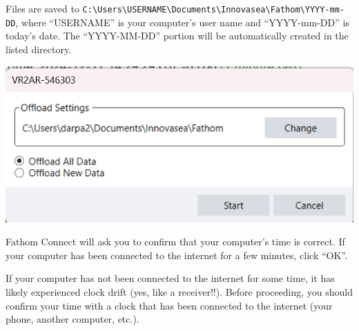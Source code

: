 \documentclass[
  letterpaper,
  DIV=11,
  numbers=noendperiod]{scrreprt}
\begin{document}
\begin{tcolorbox}[enhanced jigsaw, title=\textcolor{quarto-callout-note-color}{\faInfo}\hspace{0.5em}{Note}, leftrule=.75mm, colback=white, colframe=quarto-callout-note-color-frame, opacityback=0, toptitle=1mm, titlerule=0mm, colbacktitle=quarto-callout-note-color!10!white, toprule=.15mm, left=2mm, bottomtitle=1mm, arc=.35mm, breakable, coltitle=black, rightrule=.15mm, bottomrule=.15mm, opacitybacktitle=0.6]

Files are saved to
\texttt{C:\textbackslash{}Users\textbackslash{}USERNAME\textbackslash{}Documents\textbackslash{}Innovasea\textbackslash{}Fathom\textbackslash{}YYYY-mm-DD},
where ``USERNAME'' is your computer's user name and ``YYYY-mm-DD'' is
today's date. The ``YYYY-MM-DD'' portion will be automatically created
in the listed directory.

\end{tcolorbox}

\includegraphics{images/fathom/offload_info.png}

Fathom Connect will ask you to confirm that your computer's time is
correct. If your computer has been connected to the internet for a few
minutes, click ``OK''.

\begin{tcolorbox}[enhanced jigsaw, title=\textcolor{quarto-callout-warning-color}{\faExclamationTriangle}\hspace{0.5em}{Warning}, leftrule=.75mm, colback=white, colframe=quarto-callout-warning-color-frame, opacityback=0, toptitle=1mm, titlerule=0mm, colbacktitle=quarto-callout-warning-color!10!white, toprule=.15mm, left=2mm, bottomtitle=1mm, arc=.35mm, breakable, coltitle=black, rightrule=.15mm, bottomrule=.15mm, opacitybacktitle=0.6]

If your computer has not been connected to the internet for some time,
it has likely experienced clock drift (yes, like a receiver!!). Before
proceeding, you should confirm your time with a clock that has been
connected to the internet (your phone, another computer, etc.).

\end{tcolorbox}
\end{document}
